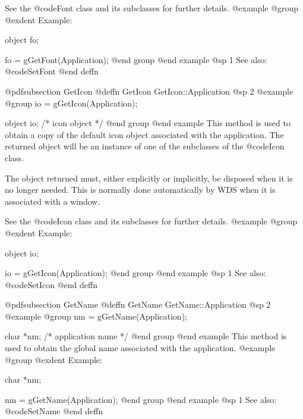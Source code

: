 See the @code{Font} class and its subclasses for further details.
@example
@group
@exdent Example:

object  fo;

fo = gGetFont(Application);
@end group
@end example
@sp 1
See also:  @code{SetFont}
@end deffn
















@pdfsubsection {GetIcon}
@deffn {GetIcon} GetIcon::Application
@sp 2
@example
@group
io = gGetIcon(Application);

object  io;     /*  icon object  */
@end group
@end example
This method is used to obtain a copy of the default icon object
associated with the application.  The returned object will be an
instance of one of the subclasses of the @code{Icon} class.

The object returned must, either explicitly or implicitly, be
disposed when it is no longer needed.  This is normally done
automatically by WDS when it is associated with a window.

See the @code{Icon} class and its subclasses for further details.
@example
@group
@exdent Example:

object  io;

io = gGetIcon(Application);
@end group
@end example
@sp 1
See also:  @code{SetIcon}
@end deffn















@pdfsubsection {GetName}
@deffn {GetName} GetName::Application
@sp 2
@example
@group
nm = gGetName(Application);

char    *nm;    /*  application name  */
@end group
@end example
This method is used to obtain the global name associated with the application.
@example
@group
@exdent Example:

char    *nm;

nm = gGetName(Application);
@end group
@end example
@sp 1
See also:  @code{SetName}
@end deffn












